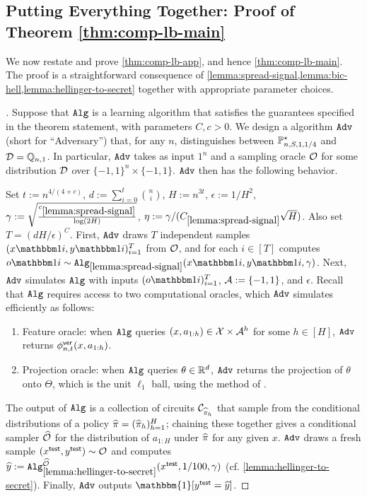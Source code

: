 %

\subsection{Putting Everything Together: Proof of Theorem \ref*{thm:comp-lb-main}}\label{subsec:comp-lb-proof}

We now restate and prove \cref{thm:comp-lb-app}, and hence \cref{thm:comp-lb-main}. The proof is a straightforward consequence of \cref{lemma:spread-signal,lemma:bic-hell,lemma:hellinger-to-secret} together with appropriate parameter choices.

\begin{proof}[]
Suppose that $\texttt{Alg}$ is a learning algorithm that satisfies the guarantees specified in the theorem statement, with parameters $C,c>0$. We design a algorithm $\texttt{Adv}$ (short for ``Adversary'') %
that, for any $n$, distinguishes between $\mathbb{P}^\star_{n,S,1,1/4}$ and $\mathcal{D} = \mathbb{Q}_{n,1}$. In particular, $\texttt{Adv}$ takes as input $1^n$ and a sampling oracle $\mathcal{O}$ for some distribution $\mathcal{D}$ over $\{-1,1\}^n \times \{-1,1\}$. $\texttt{Adv}$ then has the following behavior.

Set $t := n^{4/(4+c)}$, $d := \sum_{i=0}^t \binom{n}{i}$, $H := n^{3t}$, $\epsilon := 1/H^2$, $\gamma := \sqrt{\frac{c_{\ref{lemma:spread-signal}}}{\log(2H)}}$, $\eta := \gamma/(C_{\ref{lemma:spread-signal}}\sqrt{H})$. Also set $T = (dH/\epsilon)^C$. First, $\texttt{Adv}$ draws $T$ independent samples $(x\ind{i},y\ind{i})_{i=1}^T$ from $\mathcal{O}$, and for each $i \in [T]$ computes $o\ind{i} \sim \Alg_{\ref{lemma:spread-signal}}(x\ind{i},y\ind{i},\gamma)$. Next, $\texttt{Adv}$ simulates $\texttt{Alg}$ with inputs $(o\ind{i})_{i=1}^T$, $\mathcal{A} := \{-1,1\}$, and $\epsilon$. Recall that $\texttt{Alg}$ requires access to two computational oracles, which $\texttt{Adv}$ simulates efficiently as follows:
\begin{enumerate}
\item Feature oracle: when $\texttt{Alg}$ queries $(x,a_{1:h}) \in \mathcal{X}\times\mathcal{A}^h$ for some $h \in [H]$, $\texttt{Adv}$ returns $\phi^{\mathsf{ver}}_{n,t}(x,a_{1:h})$.
\item Projection oracle: when $\texttt{Alg}$ queries $\theta \in \mathbb{R}^d$, $\texttt{Adv}$ returns the projection of $\theta$ onto $\Theta$, which is the unit $\ell_1$ ball, using the method of \cite{duchi2008efficient}.
\end{enumerate}
The output of $\texttt{Alg}$ is a collection of circuits $\mathcal{C}_{\widehat{\pi}_h}$ that sample from the conditional distributions of a policy $\widehat{\pi}=(\widehat{\pi}_h)_{h=1}^H$; chaining these together gives a conditional sampler $\widehat{\mathcal{O}}$ for the distribution of $a_{1:H}$ under $\widehat{\pi}$ for any given $x$. $\texttt{Adv}$ draws a fresh sample $(x^{\mathsf{test}},y^{\mathsf{test}}) \sim \mathcal{O}$ and computes $\widehat{y} := \texttt{Alg}_{\ref{lemma:hellinger-to-secret}}^{\widehat{\mathcal{O}}}(x^{\mathsf{test}},1/100,\gamma)$ (cf. \cref{lemma:hellinger-to-secret}). Finally, $\texttt{Adv}$ outputs $\mathbbm{1}[\ytest = \wh{y}]$.



\end{proof}
